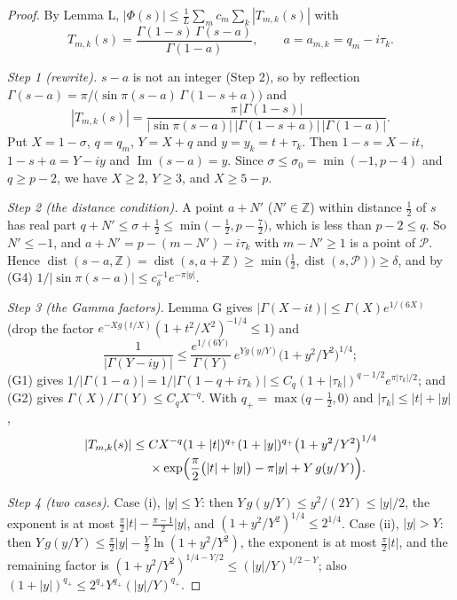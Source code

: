 \documentclass[11pt]{article}
\newcommand{\im}{\operatorname{Im}}
\newcommand{\dist}{\operatorname{dist}}
\begin{document}
\begin{proof}
By Lemma L, $|\Phi(s)|\le\frac1L\sum_mc_m\sum_k|T_{m,k}(s)|$ with
\[
T_{m,k}(s)=\frac{\Gamma(1-s)\,\Gamma(s-a)}{\Gamma(1-a)},\qquad a=a_{m,k}=q_m-i\tau_k.
\]

\emph{Step 1 (rewrite).} $s-a$ is not an integer (Step 2), so by reflection $\Gamma(s-a)=\pi/\bigl(\sin\pi(s-a)\,\Gamma(1-s+a)\bigr)$ and
\[
|T_{m,k}(s)|=\frac{\pi\,|\Gamma(1-s)|}{|\sin\pi(s-a)|\,|\Gamma(1-s+a)|\,|\Gamma(1-a)|}.
\]
Put $X=1-\sigma$, $q=q_m$, $Y=X+q$ and $y=y_k=t+\tau_k$. Then $1-s=X-it$, $1-s+a=Y-iy$ and $\im(s-a)=y$. Since $\sigma\le\sigma_0=\min(-1,p-4)$ and $q\ge p-2$, we have $X\ge2$, $Y\ge3$, and $X\ge5-p$.

\emph{Step 2 (the distance condition).} A point $a+N'$ ($N'\in\mathbb{Z}$) within distance $\frac12$ of $s$ has real part $q+N'\le\sigma+\frac12\le\min\bigl(-\frac12,p-\frac72\bigr)$, which is less than $p-2\le q$. So $N'\le-1$, and $a+N'=p-(m-N')-i\tau_k$ with $m-N'\ge1$ is a point of $\mathcal{P}$. Hence $\dist(s-a,\mathbb{Z})=\dist(s,a+\mathbb{Z})\ge\min\bigl(\frac12,\dist(s,\mathcal{P})\bigr)\ge\delta$, and by (G4) $1/|\sin\pi(s-a)|\le c_\delta^{-1}e^{-\pi|y|}$.

\emph{Step 3 (the Gamma factors).} Lemma G gives $|\Gamma(X-it)|\le\Gamma(X)e^{1/(6X)}$ (drop the factor $e^{-Xg(t/X)}(1+t^2/X^2)^{-1/4}\le1$) and
\[
\frac{1}{|\Gamma(Y-iy)|}\le\frac{e^{1/(6Y)}}{\Gamma(Y)}\,e^{Y g(y/Y)}\bigl(1+y^2/Y^2\bigr)^{1/4};
\]
(G1) gives $1/|\Gamma(1-a)|=1/|\Gamma(1-q+i\tau_k)|\le C_q(1+|\tau_k|)^{q-1/2}e^{\pi|\tau_k|/2}$; and (G2) gives $\Gamma(X)/\Gamma(Y)\le C_qX^{-q}$. With $q_+=\max\bigl(q-\frac12,0\bigr)$ and $|\tau_k|\le|t|+|y|$,
\begin{align*}
|T_{m,k}(s)|\le{}&C X^{-q}(1+|t|)^{q_+}(1+|y|)^{q_+}\bigl(1+y^2/Y^2\bigr)^{1/4}\\
&\times\exp\Bigl(\frac\pi2\bigl(|t|+|y|\bigr)-\pi|y|+Y\,g(y/Y)\Bigr).
\end{align*}

\emph{Step 4 (two cases).} Case (i), $|y|\le Y$: then $Y\,g(y/Y)\le y^2/(2Y)\le|y|/2$, the exponent is at most $\frac\pi2|t|-\frac{\pi-1}{2}|y|$, and $(1+y^2/Y^2)^{1/4}\le2^{1/4}$. Case (ii), $|y|>Y$: then $Y\,g(y/Y)\le\frac\pi2|y|-\frac Y2\ln(1+y^2/Y^2)$, the exponent is at most $\frac\pi2|t|$, and the remaining factor is $(1+y^2/Y^2)^{1/4-Y/2}\le(|y|/Y)^{1/2-Y}$; also $(1+|y|)^{q_+}\le2^{q_+}Y^{q_+}(|y|/Y)^{q_+}$.


\end{proof}
\end{document}
